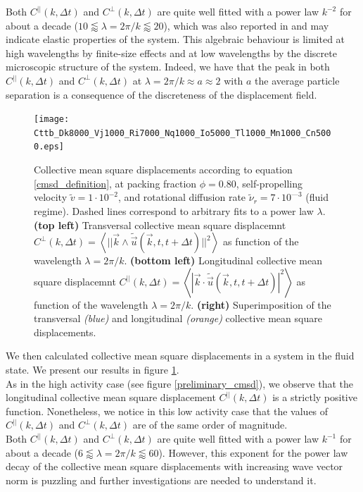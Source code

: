 \documentclass[class=report, float=false, crop=false]{standalone}
\begin{document}
Both $C^{||}(k, \Delta t)$ and $C^{\perp}(k, \Delta t)$ are quite well fitted with a power law $k^{-2}$ for about a decade ($10 \lessapprox \lambda = 2\pi/k \lessapprox 20$), which was also reported in \cite{leonforte2005continuum} and may indicate elastic properties of the system. This algebraic behaviour is limited at high wavelengths by finite-size effects and at low wavelengths by the discrete microscopic structure of the system. Indeed, we have that the peak in both $C^{||}(k, \Delta t)$ and $C^{\perp}(k, \Delta t)$ at $\lambda = 2\pi/k \approx a \approx 2$ with $a$ the average particle separation is a consequence of the discreteness of the displacement field.

\begin{figure}[H]
\centering
\texttt{[image: Cttb\_Dk8000\_Vj1000\_Ri7000\_Nq1000\_Io5000\_Tl1000\_Mn1000\_Cn5000.eps]}
\caption{Collective mean square displacements according to equation \ref{cmsd_definition}, at packing fraction $\phi = 0.80$, self-propelling velocity $\tilde{v} = 1\cdot10^{-2}$, and rotational diffusion rate $\tilde{\nu}_r = 7\cdot10^{—3}$ (fluid regime). Dashed lines correspond to arbitrary fits to a power law $\lambda$. \textbf{(top left)} Transversal collective mean square displacemnt $C^{\perp}(k, \Delta t) = \left<||\vec{k}\wedge\tilde{\vec{u}}(\vec{k}, t, t + \Delta t)||^2\right>$ as function of the wavelength $\lambda = 2\pi/k$. \textbf{(bottom left)} Longitudinal collective mean square displacemnt $C^{||}(k, \Delta t) = \left<|\vec{k}\cdot\tilde{\vec{u}}(\vec{k}, t, t + \Delta t)|^2\right>$ as function of the wavelength $\lambda = 2\pi/k$. \textbf{(right)} Superimposition of the transversal \textit{(blue)} and longitudinal \textit{(orange)} collective mean square displacements.}
\label{preliminary_cmsd_low_activity}
\end{figure}

We then calculated collective mean square displacements in a system in the fluid state. We present our results in figure \ref{preliminary_cmsd_low_activity}.\\

As in the high activity case (see figure \ref{preliminary_cmsd}), we observe that the longitudinal collective mean square displacement $C^{||}(k, \Delta t)$ is a strictly positive function. Nonetheless, we notice in this low activity case that the values of $C^{||}(k, \Delta t)$ and $C^{\perp}(k, \Delta t)$ are of the same order of magnitude.\\

Both $C^{||}(k, \Delta t)$ and $C^{\perp}(k, \Delta t)$ are quite well fitted with a power law $k^{-1}$ for about a decade ($6 \lessapprox \lambda = 2\pi/k \lessapprox 60$). However, this exponent for the power law decay of the collective mean square displacements with increasing wave vector norm is puzzling and further investigations are needed to understand it.
\end{document}
